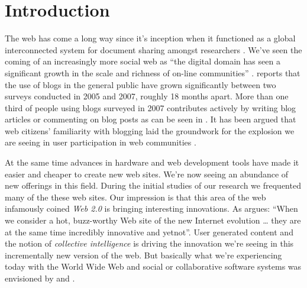 \chapter{Introduction}

%
%

The web has come a long way since it's inception when it functioned as a
global interconnected system for document sharing amongst researchers
\citep[p.~82]{bernerslee92}. We've
seen the coming of an increasingly more social web as
``the digital domain has seen a significant growth in the scale and richness
of on-line communities'' \citep[p.~44]{backstrom06}.
\citet[ch.~1, p.~2]{rosa07} reports that the
use of blogs in the general public%
have grown significantly between two surveys conducted in 2005 and 2007,
roughly 18 months apart.
More than one third of people using blogs surveyed in 2007 contributes
actively by writing blog articles or commenting on blog posts as can be seen in
\citep[ch.~1, p.~6]{rosa07}.
It has been argued that web citizens'
familiarity with blogging laid the groundwork for the explosion we are seeing
in user participation in web communities \citep{weiss05,beer07}.

At the same time advances in hardware and web development tools have made it
easier and cheaper to create new web sites. We're now seeing an
abundance of new offerings in this field.
During the initial studies of our research we frequented
many of the these web sites. Our impression is that
this area of the web infamously coined \emph{Web 2.0}%
is bringing interesting innovations. As \citet[p.~18]{weiss05} argues:
``When we consider a hot, buzz-worthy Web site of the new Internet evolution
\ldots
they are at the same time incredibly innovative and yet\dash{}not''.
User generated content and the notion of \emph{collective intelligence} is
driving the innovation we're seeing in this incrementally new version of the
web. But basically what we're experiencing today with the World Wide Web
and social or collaborative software systems was envisioned by \citet{bush45}
and \citet{licklider68}.

